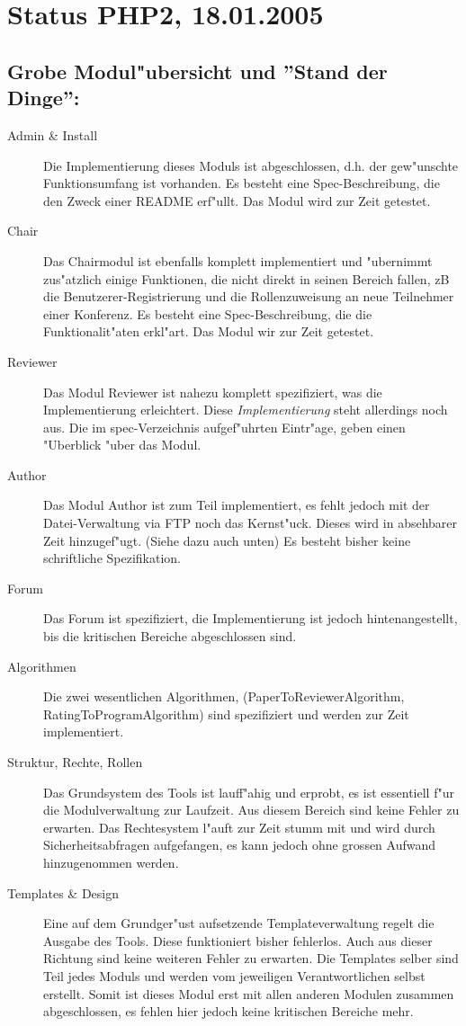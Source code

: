 \documentclass{article}
\begin{document}
\section*{Status PHP2, 18.01.2005}
\subsection*{Grobe Modul"ubersicht und ''Stand der Dinge'':}
\begin{description}
\item[Admin \& Install] Die Implementierung dieses Moduls ist
  abgeschlossen, d.h. der gew"unschte Funktionsumfang ist vorhanden.  Es
  besteht eine Spec-Beschreibung, die den Zweck einer README erf"ullt.  Das
  Modul wird zur Zeit getestet.
\item[Chair] Das Chairmodul ist ebenfalls komplett implementiert und
  "ubernimmt zus"atzlich einige Funktionen, die nicht direkt in seinen
  Bereich fallen, zB die Benutzerer-Registrierung und die Rollenzuweisung
  an neue Teilnehmer einer Konferenz.  Es besteht eine Spec-Beschreibung,
  die die Funktionalit"aten erkl"art.  Das Modul wir zur Zeit getestet.
\item[Reviewer] Das Modul Reviewer ist nahezu komplett spezifiziert, was
  die Implementierung erleichtert. Diese \emph{Implementierung} steht
  allerdings noch aus.  Die im spec-Verzeichnis aufgef"uhrten Eintr"age,
  geben einen "Uberblick "uber das Modul.
\item[Author] Das Modul Author ist zum Teil implementiert, es fehlt jedoch
  mit der Datei-Verwaltung via FTP noch das Kernst"uck. Dieses wird in
  absehbarer Zeit hinzugef"ugt. (Siehe dazu auch unten) Es besteht bisher
  keine schriftliche Spezifikation.
\item[Forum] Das Forum ist spezifiziert, die Implementierung ist jedoch
  hintenangestellt, bis die kritischen Bereiche abgeschlossen sind.
\item[Algorithmen] Die zwei wesentlichen Algorithmen,
  (PaperToReviewerAlgorithm, RatingToProgramAlgorithm) sind spezifiziert
  und werden zur Zeit implementiert.
\item[Struktur, Rechte, Rollen] Das Grundsystem des Tools ist lauff"ahig
  und erprobt, es ist essentiell f"ur die Modulverwaltung zur Laufzeit. Aus
  diesem Bereich sind keine Fehler zu erwarten.  Das Rechtesystem l"auft
  zur Zeit stumm mit und wird durch Sicherheitsabfragen aufgefangen, es
  kann jedoch ohne grossen Aufwand hinzugenommen werden.
\item[Templates \& Design] Eine auf dem Grundger"ust aufsetzende
  Templateverwaltung regelt die Ausgabe des Tools. Diese funktioniert
  bisher fehlerlos. Auch aus dieser Richtung sind keine weiteren Fehler zu
  erwarten.  Die Templates selber sind Teil jedes Moduls und werden vom
  jeweiligen Verantwortlichen selbst erstellt. Somit ist dieses Modul erst
  mit allen anderen Modulen zusammen abgeschlossen, es fehlen hier jedoch
  keine kritischen Bereiche mehr.
\end{description}
\end{document}
